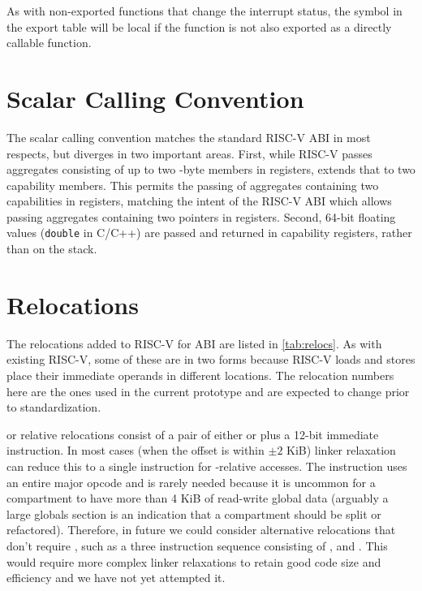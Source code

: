 As with non-exported functions that change the interrupt status, the symbol in the export table will be local if the function is not also exported as a directly callable function.

\section{Scalar Calling Convention}

The \cherimcu{} scalar calling convention matches the standard RISC-V ABI in most respects, but diverges in two important areas.
First, while RISC-V passes aggregates consisting of up to two \xlen-byte members in registers, \cherimcu{} extends that to two capability members.
This permits the passing of aggregates containing two capabilities in registers, matching the intent of the RISC-V ABI which allows passing aggregates containing two pointers in registers.
Second, 64-bit floating values (\texttt{double} in C/C++) are passed and returned in capability registers, rather than on the stack.

\section{Relocations}
\label{sec:relocs}

The relocations added to RISC-V for \cherimcu{} ABI are listed in \cref{tab:relocs}.
As with existing RISC-V, some of these are in two forms because RISC-V loads and stores place their immediate operands in different locations.
The relocation numbers here are the ones used in the current prototype and are expected to change prior to standardization.

\PCC{} or \CGP{} relative relocations consist of a pair of either  or  plus a 12-bit immediate instruction.
In most cases (when the offset is within $\pm2$ KiB) linker relaxation can reduce this to a single instruction for \CGP-relative accesses.
The  instruction uses an entire major opcode and is rarely needed because it is uncommon for a compartment to have more than 4 KiB of read-write global data (arguably a large globals section is an indication that a compartment should be split or refactored).
Therefore, in future we could consider alternative relocations that don't require , such as a three instruction sequence consisting of ,  and .
This would require more complex linker relaxations to retain good code size and efficiency and we have not yet attempted it.

